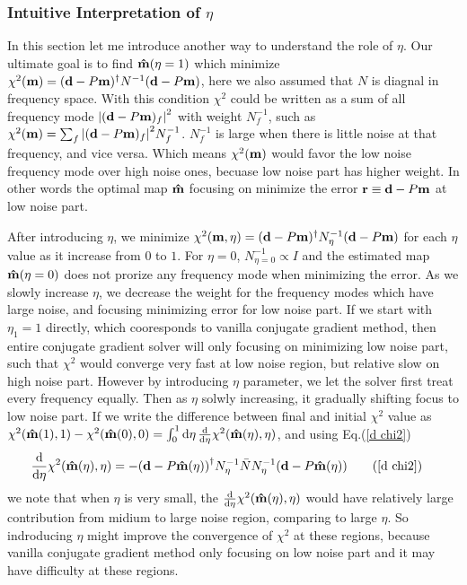 \documentclass[11pt, letterpaper]{article}
\newcommand{\vbd}{\vb{d}}
\newcommand{\vbm}{\vb{m}}
\newcommand{\inv}[1]{#1^{-1}}
\newcommand{\hatm}{\vb{\hat{m}}}
\newcommand{\Nbar}{\bar{N}}
\newcommand{\Neta}{N_{\eta}}
\begin{document}
\subsubsection{Intuitive Interpretation of $\eta$}\label{intuitive interp}
In this section let me introduce another way to understand the role of $\eta$.
Our ultimate goal is to find $\hatm(\eta=1)$ which minimize 
$\chi^2(\vbm) = (\vbd - P\vbm)^{\dagger} \inv{N} (\vbd - P\vbm)$,
here we also assumed that $N$ is diagnal in frequency space.
With this condition $\chi^2$ could be written as a sum of all frequency mode 
$\qty|(\vbd-P\vbm)_f|^2$ with weight $\inv{N}_f$, such as
$\chi^2(\vbm) = \sum_f \qty|(\vbd-P\vbm)_f|^2 \inv{N}_f$.
$\inv{N}_f$ is large when there is little noise at that frequency,
and vice versa.
Which means $\chi^2(\vbm)$ would favor the low noise frequency mode over high 
noise ones, becuase low noise part has higher weight.
In other words the optimal map $\hatm$ focusing on minimize the error
$\vb{r} \equiv \vbd - P\vbm$ at low noise part.

After introducing $\eta$, we minimize
$\chi^2(\vbm,\eta)=(\vbd-P\vbm)^{\dagger} N_{\eta}^{-1} (\vbd - P\vbm)$
for each $\eta$ value as it increase from $0$ to $1$.
For $\eta=0$, $N^{-1}_{\eta=0} \propto I$ and the estimated map $\hatm(\eta=0)$
does not prorize any frequency mode when minimizing the error.
As we slowly increase $\eta$, we decrease the weight for the frequency modes
which have large noise, and focusing minimizing error for low noise part.
If we start with $\eta_1=1$ directly, which cooresponds to vanilla conjugate
gradient method, then entire conjugate gradient solver
will only focusing on minimizing low noise part, such that $\chi^2$ would
converge very fast at low noise region, but relative slow on high noise part.
However by introducing $\eta$ parameter, we let the solver first treat every
frequency equally.
Then as $\eta$ solwly increasing, it gradually shifting focus to low noise
part.
If we write the difference between final and initial $\chi^2$ value as
$\chi^2(\hatm(1),1) - \chi^2(\hatm(0),0) = \int_0^1 \dd{\eta}
\dv{\eta} \chi^2(\hatm(\eta),\eta)$,
and using Eq.(\ref{d chi2})
\begin{align}
\dv{\eta} \chi^2(\hatm(\eta), \eta) 
&= - \qty(\vbd - P\hatm(\eta))^{\dagger} \inv{\Neta} \Nbar \inv{\Neta} 
    (\vbd - P\hatm(\eta)) \tag{\ref{d chi2}}
\end{align}
we note that when $\eta$ is very small, 
the $\dv{\eta}\chi^2(\hatm(\eta),\eta)$ would have relatively large
contribution from midium to large noise region, comparing to large $\eta$.
So indroducing $\eta$ might improve the convergence of $\chi^2$ at these
regions, because vanilla conjugate gradient method only focusing on low noise
part and it may have difficulty at these regions.
\end{document}
